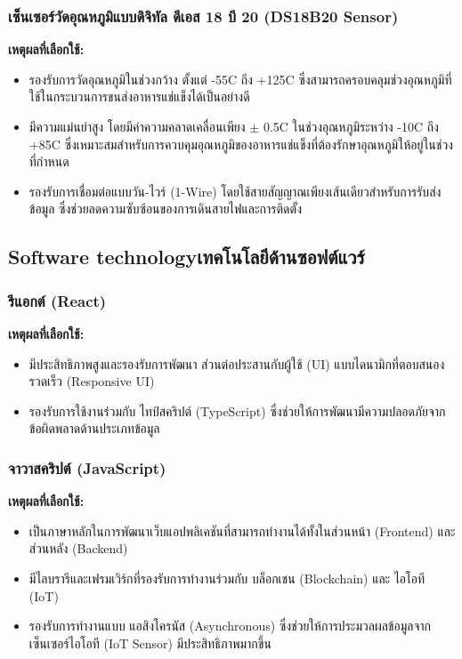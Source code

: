 \subsubsection{เซ็นเซอร์วัดอุณหภูมิแบบดิจิทัล ดีเอส 18 บี 20 (DS18B20 Sensor)}
\textbf{เหตุผลที่เลือกใช้:}
\begin{itemize}
    \item รองรับการวัดอุณหภูมิในช่วงกว้าง ตั้งแต่ -55\textdegree C ถึง +125\textdegree C ซึ่งสามารถครอบคลุมช่วงอุณหภูมิที่ใช้ในกระบวนการขนส่งอาหารแช่แข็งได้เป็นอย่างดี
    \item มีความแม่นยำสูง โดยมีค่าความคลาดเคลื่อนเพียง $\pm$ 0.5\textdegree C ในช่วงอุณหภูมิระหว่าง -10\textdegree C ถึง +85\textdegree C ซึ่งเหมาะสมสำหรับการควบคุมอุณหภูมิของอาหารแช่แข็งที่ต้องรักษาอุณหภูมิให้อยู่ในช่วงที่กำหนด
    \item รองรับการเชื่อมต่อแบบวัน-ไวร์ (1-Wire) โดยใช้สายสัญญาณเพียงเส้นเดียวสำหรับการรับส่งข้อมูล ซึ่งช่วยลดความซับซ้อนของการเดินสายไฟและการติดตั้ง
\end{itemize}


\subsection{\ifenglish Software technology\else เทคโนโลยีด้านซอฟต์แวร์\fi}
\subsubsection{รีแอกต์ (React)}
\textbf{เหตุผลที่เลือกใช้:}
\begin{itemize}
    \item มีประสิทธิภาพสูงและรองรับการพัฒนา ส่วนต่อประสานกับผู้ใช้ (UI) แบบไดนามิกที่ตอบสนองรวดเร็ว (Responsive UI)
    \item รองรับการใช้งานร่วมกับ ไทป์สคริปต์ (TypeScript) ซึ่งช่วยให้การพัฒนามีความปลอดภัยจากข้อผิดพลาดด้านประเภทข้อมูล
\end{itemize}

\subsubsection{จาวาสคริปต์ (JavaScript)}
\textbf{เหตุผลที่เลือกใช้:}
\begin{itemize}
    \item เป็นภาษาหลักในการพัฒนาเว็บแอปพลิเคชันที่สามารถทำงานได้ทั้งในส่วนหน้า (Frontend) และส่วนหลัง (Backend)
    \item มีไลบรารีและเฟรมเวิร์กที่รองรับการทำงานร่วมกับ บล็อกเชน (Blockchain) และ ไอโอที (IoT)
    \item รองรับการทำงานแบบ แอสิงโครนัส (Asynchronous) ซึ่งช่วยให้การประมวลผลข้อมูลจากเซ็นเซอร์ไอโอที (IoT Sensor) มีประสิทธิภาพมากขึ้น
\end{itemize}
